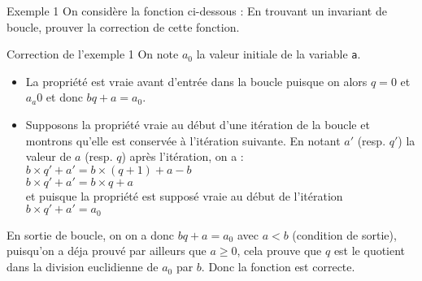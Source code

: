 \documentclass[10pt]{beamer}
\begin{document}
\begin{frame}[fragile]{\Ctitle}{\stitle}
	\begin{exampleblock}{Exemple 1}
		On considère la fonction ci-dessous :
		\onslide<2-> En trouvant un invariant de boucle, prouver la correction de cette fonction.
	\end{exampleblock}
\end{frame}

\begin{frame}[fragile]{\Ctitle}{\stitle}
	\begin{exampleblock}{Correction de l'exemple 1}
		\textcolor{OliveGreen}{On note  $a_0$ la valeur initiale de la variable {\tt a}.}
		\onslide<2->{\textcolor{OliveGreen}{Montrons que la propriété : \\}   \og{} $a_0 = bq + a$ \fg{}  \textcolor{OliveGreen}{est un invariant de boucle.}}
		\begin{itemize}
			\item<4-> \textcolor{OliveGreen}{La propriété est vraie avant d'entrée dans la boucle puisque on alors $q=0$ et $a_a0$ et donc $bq + a = a_0$.}
			\item<5-> \textcolor{OliveGreen}{Supposons la propriété vraie au début d'une itération de la boucle et montrons qu'elle est conservée à l'itération suivante. En notant $a'$ (resp. $q'$) la valeur de $a$ (resp. $q$) après l'itération, on a : \\
					$b \times q' + a' = b \times (q+1) + a - b$ \\
					$b \times q' + a' = b \times q + a $ \\ et puisque la propriété est supposé vraie au début de l'itération
					$b \times q' + a' = a_0$\\
				}
		\end{itemize}
		\textcolor{OliveGreen}{En sortie de boucle, on on a donc $bq + a = a_0$ avec $a <b$ (condition de sortie), puisqu'on a déja prouvé par ailleurs que $a \geqslant 0$, cela prouve que $q$ est le quotient dans la division euclidienne de $a_0$ par $b$. Donc la fonction est correcte.}
	\end{exampleblock}
\end{frame}
\end{document}
